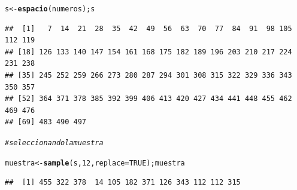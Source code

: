 \documentclass[12pt,letterpaper]{article}\usepackage[]{graphicx}\usepackage[]{color}
\makeatletter
\newcommand{\hlnum}[1]{\textcolor[rgb]{0.686,0.059,0.569}{#1}}%
\newcommand{\hlcom}[1]{\textcolor[rgb]{0.678,0.584,0.686}{\textit{#1}}}%
\newcommand{\hlstd}[1]{\textcolor[rgb]{0.345,0.345,0.345}{#1}}%
\newcommand{\hlkwb}[1]{\textcolor[rgb]{0.69,0.353,0.396}{#1}}%
\newcommand{\hlkwc}[1]{\textcolor[rgb]{0.333,0.667,0.333}{#1}}%
\newcommand{\hlkwd}[1]{\textcolor[rgb]{0.737,0.353,0.396}{\textbf{#1}}}%
\newenvironment{kframe}{%
 \def\at@end@of@kframe{}%
 \ifinner\ifhmode%
  \def\at@end@of@kframe{\end{minipage}}%
  \begin{minipage}{\columnwidth}%
 \fi\fi%
 \def\FrameCommand##1{\hskip\@totalleftmargin \hskip-\fboxsep
 \colorbox{shadecolor}{##1}\hskip-\fboxsep
     \hskip-\linewidth \hskip-\@totalleftmargin \hskip\columnwidth}%
 \MakeFramed {\advance\hsize-\width
   \@totalleftmargin\z@ \linewidth\hsize
   \@setminipage}}%
 {\par\unskip\endMakeFramed%
 \at@end@of@kframe}
\newenvironment{knitrout}{}{} %
\makeatother
\begin{document}
\begin{enumerate}
\begin{knitrout}
\begin{kframe}
\begin{alltt}
\hlstd{s} \hlkwb{<-} \hlkwd{espacio}\hlstd{(numeros); s}
\end{alltt}
\begin{verbatim}
##  [1]   7  14  21  28  35  42  49  56  63  70  77  84  91  98 105 112 119
## [18] 126 133 140 147 154 161 168 175 182 189 196 203 210 217 224 231 238
## [35] 245 252 259 266 273 280 287 294 301 308 315 322 329 336 343 350 357
## [52] 364 371 378 385 392 399 406 413 420 427 434 441 448 455 462 469 476
## [69] 483 490 497
\end{verbatim}
\end{kframe}
\end{knitrout}

\begin{knitrout}
\color{fgcolor}\begin{kframe}
\begin{alltt}
\hlcom{# seleccionando la muestra }

\hlstd{muestra} \hlkwb{<-} \hlkwd{sample}\hlstd{(s,} \hlnum{12}\hlstd{,} \hlkwc{replace}\hlstd{=}\hlnum{TRUE}\hlstd{); muestra}
\end{alltt}
\begin{verbatim}
##  [1] 455 322 378  14 105 182 371 126 343 112 112 315
\end{verbatim}
\end{kframe}
\end{knitrout}
\end{enumerate}
\end{document}
